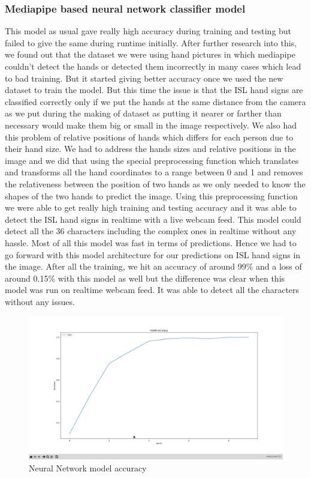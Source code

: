 \documentclass[12pt,a4paper]{report}
\begin{document}
\subsubsection{Mediapipe based neural network classifier model}
This model as usual gave really high accuracy during training and testing but failed to give the same during runtime initially. After further research into this, we found out that the dataset we were using hand pictures in which mediapipe couldn't detect the hands or detected them incorrectly in many cases which lead to bad training. But it started giving better accuracy once we used the new dataset to train the model. But this time the issue is that the ISL hand signs are classified correctly only if we put the hands at the same distance from the camera as we put during the making of dataset as putting it nearer or farther than necessary would make them big or small in the image respectively. We also had this problem of relative positions of hands which differs for each person due to their hand size. We had to address the hands sizes and relative positions in the image and we did that using the special preprocessing function which translates and transforms all the hand coordinates to a range between 0 and 1 and removes the relativeness between the position of two hands as we only needed to know the shapes of the two hands to predict the image. Using this preprocessing function we were able to get really high training and testing accuracy and it was able to detect the ISL hand signs in realtime with a live webcam feed. This model could detect all the 36 characters including the complex ones in realtime without any hassle. Most of all this model was fast in terms of predictions. Hence we had to go forward with this model architecture for our predictions on ISL hand signs in the image. After all the training, we hit an accuracy of around 99\% and a loss of around 0.15\% with this model as well but the difference was clear when this model was run on realtime webcam feed. It was able to detect all the characters without any issues.
\begin{figure}[htbp]
	\centerline{\includegraphics[scale=0.15]{neural_network_accuracy.png}}
	\caption{Neural Network model accuracy}
	\label{Neural_net_accuracy}
\end{figure}
\end{document}
